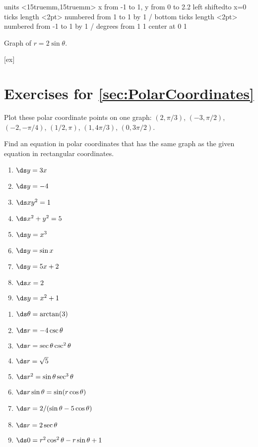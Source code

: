\figure[H]
\centerline{\vbox{\beginpicture
\normalgraphs
\setcoordinatesystem units <15truemm,15truemm>
\setplotarea x from -1 to 1, y from 0 to 2.2
\axis left shiftedto x=0 ticks length <2pt> numbered from 1 to 1 by 1 /
\axis bottom ticks length <2pt> numbered from -1 to 1 by 1 /
 degrees from 1 1 center at 0 1
\endpicture}}
\caption{Graph of $r=2\sin\theta$.\label{fig:circle from polar equation}}
\endfigure


[ex]
\section*{Exercises for \ref{sec:PolarCoordinates}}

\begin{enumialphparenastyle}

\begin{ex}
Plot these polar coordinate points on one graph:
$(2,\pi/3)$, $(-3,\pi/2)$, $(-2,-\pi/4)$, $(1/2,\pi)$, $(1,4\pi/3)$, 
$(0,3\pi/2)$.
\end{ex}

\begin{ex}
Find an equation in polar coordinates that has the same
graph as the given equation in rectangular coordinates.
\begin{multicols}{3}
\begin{enumerate}
	\item	$\ds y=3x$
	\item	$\ds y=-4$
	\item	$\ds xy^2=1$
	\item	$\ds x^2+y^2=5$
	\item	$\ds y=x^3$
	\item	$\ds y=\sin x$
	\item	$\ds y=5x+2$
	\item	$\ds x=2$
	\item	$\ds y=x^2+1$
\end{enumerate}
\end{multicols}
\begin{sol}
\begin{multicols}{3}
\begin{enumerate}
	\item	$\ds \theta=\arctan(3)$
	\item	$\ds r=-4\csc\theta$
	\item	$\ds r=\sec\theta\csc^2\theta$
	\item	$\ds r=\sqrt{5}$
	\item	$\ds r^2=\sin\theta\sec^3\theta$
	\item	$\ds r\sin\theta=\sin(r\cos\theta)$
	\item	$\ds r=2/(\sin\theta-5\cos\theta)$
	\item	$\ds r=2\sec\theta$
	\item	$\ds 0=r^2\cos^2\theta-r\sin\theta+1$
\end{enumerate}
\end{multicols}
\end{sol}
\end{ex}



\end{enumialphparenastyle}
